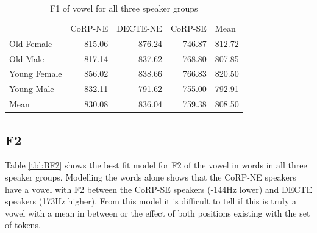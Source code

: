 \documentclass[../../00.FullDoc/tex/Thesis]{subfiles}
\begin{document}


\begin{table}[htbp]
	\centering
	\begin{tabular}{lrrrr}
		& \multicolumn{1}{l}{CoRP-NE} & \multicolumn{1}{l}{DECTE-NE} & \multicolumn{1}{l}{CoRP-SE} & \multicolumn{1}{l}{Mean} \\
		Old Female & 815.06 & 876.24 & 746.87 & 812.72 \\
		Old Male & 817.14 & 837.62 & 768.80 & 807.85 \\
		Young Female & 856.02 & 838.66 & 766.83 & 820.50 \\
		Young Male & 832.11 & 791.62 & 755.00 & 792.91 \\
		Mean  & 830.08 & 836.04 & 759.38 & 808.50 \\
	\end{tabular}%
	\caption{F1 of \bath{} vowel for all three speaker groups}
	\label{tbl:BF1-inter}%
\end{table}%





\subsection{F2} \label{subsec:bathF2}
Table \ref{tbl:BF2} shows the best fit model for F2 of the vowel in \bath{} words in all three speaker groups. Modelling the \bath{} words alone shows that the CoRP-NE speakers have a vowel with F2 between the CoRP-SE speakers (-144Hz lower) and DECTE speakers (173Hz higher). From this model it is difficult to tell if this is truly a vowel with a mean in between or the effect of both positions existing with the set of tokens. 

 

\begin{figure}[h]

	\caption{\bath{}} \label{fig:TBPNEF2}
\end{figure}

\begin{figure}[h]
	
	\caption{\bath{}} \label{fig:BF2}
\end{figure}

\begin{figure}[h]
	
	\caption{\bath{}} \label{fig:TBPF2}
\end{figure}
\end{document}
